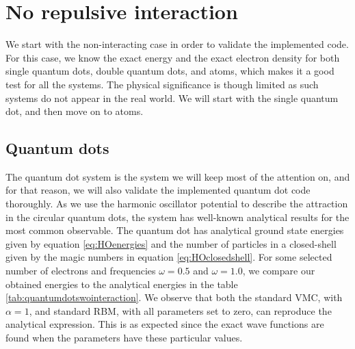 \newpage
\section{No repulsive interaction} \label{sec:norepulsive}
We start with the non-interacting case in order to validate the implemented code. For this case, we know the exact energy and the exact electron density for both single quantum dots, double quantum dots, and atoms, which makes it a good test for all the systems. The physical significance is though limited as such systems do not appear in the real world. We will start with the single quantum dot, and then move on to atoms. 

\subsection{Quantum dots}
The quantum dot system is the system we will keep most of the attention on, and for that reason, we will also validate the implemented quantum dot code thoroughly. As we use the harmonic oscillator potential to describe the attraction in the circular quantum dots, the system has well-known analytical results for the most common observable. The quantum dot has analytical ground state energies given by equation \eqref{eq:HOenergies} and the number of particles in a closed-shell given by the magic numbers in equation \eqref{eq:HOclosedshell}. For some selected number of electrons and frequencies $\omega=0.5$ and $\omega=1.0$, we compare our obtained energies to the analytical energies in the table \eqref{tab:quantumdotswointeraction}. We observe that both the standard VMC, with $\alpha=1$, and standard RBM, with all parameters set to zero, can reproduce the analytical expression. This is as expected since the exact wave functions are found when the parameters have these particular values.

